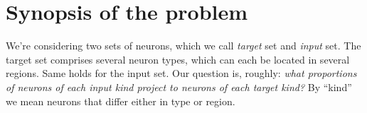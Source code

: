 \documentclass[\ifafour a4paper,12pt,\else a5paper,10pt,\fi%
onecolumn,oneside,article,%
british%
]{memoir}
\title{\propertitle}
\author{%
\hspace*{\stretch{1}}%
\parbox{0.49\linewidth}%
{\protect\centering P.G.L.  Porta Mana\\%
\footnotesize\epost{\email{piero.mana}{ntnu.no}}}%
\hspace*{\stretch{1}}%
\parbox{0.49\linewidth}%
{\protect\centering B. Jacobsen\\%
\footnotesize\epost{\email{bente.jacobsen}{ntnu.no}}}%
\hspace*{\stretch{1}}%
}
\date{\firstpublished; updated \updated}
\theoremstyle{remark}
\theoremstyle{innote}
\newcommand*{\amp}{\&}
\newcommand*{\asudedication}[1]{%
{\par\centering\textit{#1}\par}}
\renewcommand*{\|}[1][]{\nonscript\,#1\vert\nonscript\;\mathopen{}}
\begin{document}
\captiondelim{\quad}\captionnamefont{\footnotesize}\captiontitlefont{\footnotesize}
\frenchspacing
\maketitle

\abstractrunin
\abslabeldelim{}
\renewcommand*{\abstractname}{}
\setlength{\absleftindent}{0pt}
\setlength{\absrightindent}{0pt}
\setlength{\abstitleskip}{-\absparindent}
\begin{abstract}%
  \noindent Notes on Bente's problem about inferring connectivity. This is
  just a memo, not meant to be detailed or precise.
\end{abstract}
\frenchspacing





\section{Synopsis of the problem}
\label{sec:synopsis}

We're considering two sets of neurons, which we call \emph{target} set and
\emph{input} set. The target set comprises several neuron types, which can
each be located in several regions. Same holds for the input set. Our
question is, roughly: \emph{what proportions of neurons of each input kind
  project to neurons of each target kind?} By \enquote{kind} we mean
neurons that differ either in type or region.
\end{document}
